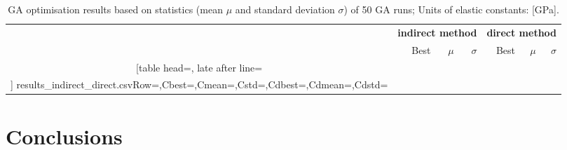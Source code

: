 \documentclass[preprint,12pt]{elsarticle}
\begin{document}

\begin{table}[h]
	\renewcommand{\arraystretch}{1.3}
	\centering \footnotesize
	\caption{GA optimisation results based on statistics (mean \(\mu\) and standard 
	deviation \(\sigma\)) of 50 GA runs; Units of  elastic constants: [GPa].}	
	\begin{tabular}{crrrrrr} \toprule
		&\multicolumn{3}{c}{\textbf{indirect method}} & \multicolumn{3}{c}{\textbf{direct method} }\\
		\cmidrule(lr){2-4} \cmidrule(lr){5-7} 
	&Best & \(\mu\) & \(\sigma\)& Best& \(\mu\) & \(\sigma\)\\
	\cmidrule(lr){2-4} \cmidrule(lr){5-7} 
		\csvreader[table head=\toprule ,
		late after line=\\ ]%
		{results_indirect_direct.csv}{Row=\constants,Cbest=\cbest,Cmean=\cmean,Cstd=\cstd,Cdbest=\cdbest,Cdmean=\cdmean,Cdstd=\cdstd}%
		{\constants & \cbest & \cmean & \cstd& \cdbest & \cdmean & \cdstd}%
		\bottomrule
	\end{tabular}	
	\label{tab:csv_results}
\end{table}
	\section{Conclusions}
\end{document}
